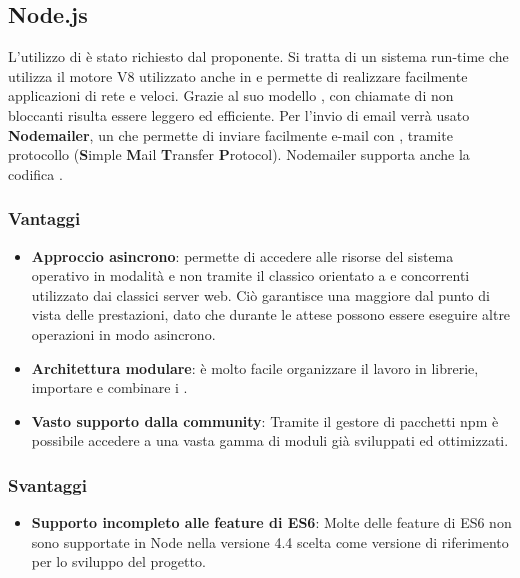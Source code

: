 \subsection{Node.js}
L'utilizzo di  \`e stato richiesto dal proponente. Si tratta di un sistema run-time  che utilizza il motore  V8 utilizzato anche in  e permette di realizzare facilmente applicazioni di rete  e veloci. Grazie al suo modello , con chiamate di  non bloccanti risulta essere leggero ed efficiente. Per l'invio di email verrà usato \textbf{Nodemailer}, un  che permette di inviare facilmente e-mail con , tramite protocollo  (\textbf{S}imple \textbf{M}ail \textbf{T}ransfer \textbf{P}rotocol). Nodemailer supporta anche la codifica .
\subsubsection{Vantaggi}
\begin{itemize}
\item \textbf{Approccio asincrono}: permette di accedere alle risorse del sistema operativo in modalit\`a  e non tramite il classico  orientato a  e  concorrenti utilizzato dai classici server web. Ci\`o garantisce una maggiore  dal punto di vista delle prestazioni, dato che durante le attese possono essere eseguire altre operazioni in modo asincrono.
\item \textbf{Architettura modulare}: \`e molto facile organizzare il lavoro in librerie, importare e combinare i .
\item \textbf{Vasto supporto dalla community}: Tramite il gestore di pacchetti npm è possibile accedere a una vasta gamma di moduli già sviluppati ed ottimizzati. 
\end{itemize}
\subsubsection{Svantaggi}
\begin{itemize}
\item \textbf{Supporto incompleto alle feature di ES6}: Molte delle feature di ES6 non sono supportate in Node nella versione 4.4 scelta come versione di riferimento per lo sviluppo del progetto.
\end{itemize}

